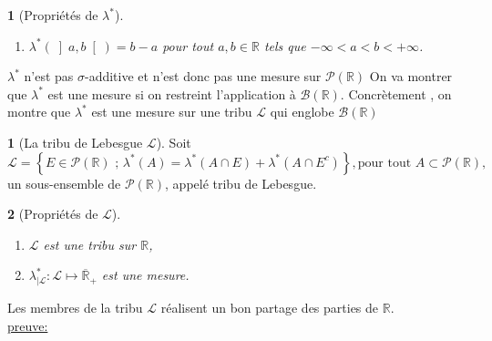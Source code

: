 \documentclass[8pt,notheorems]{beamer}
\def \R{\mathbb R}
\newtheorem{prop}{\translate{Proposition}}
\theoremstyle{definition}
\newtheorem{definition}{\translate{Definition}}
\theoremstyle{example}
\theoremstyle{mystyle}
\theoremstyle{plain}
\begin{document}
\begin{frame}[allowframebreaks]
\begin{prop}[Propriétés de $\lambda^{\ast}$]
\begin{enumerate}
$$
\lambda^{\ast}(A)\leq \sum_{n\in\mathbb{N}}\lambda^{\ast}(A_n).
$$
($\lambda^{\ast}$ est sous $\sigma$-additive)
\item $\lambda^{\ast}\left(\left]a,b\right[\right)=b-a$ pour tout $a,b\in\mathbb{R}$ tels que $-\infty<a<b<+\infty$.
\end{enumerate}
\end{prop}
$\lambda^{\ast}$ n'est pas $\sigma$-additive et n'est donc pas une mesure sur $\mathcal{P}(\mathbb{R})$ On va montrer que $\lambda^{\ast}$ est une mesure si on restreint l'application à $\mathcal{B}(\mathbb{R})$. Concrètement , on montre que $\lambda^{\ast}$ est une mesure sur une tribu $\mathcal{L}$ qui englobe $\mathcal{B}(\mathbb{\R})$
\begin{definition}[La tribu de Lebesgue $\mathcal{L}$]
Soit
$$
\mathcal{L}=\left\{ E\in\mathcal{P}(\R)\text{ ; }\lambda^{\ast}(A)=\lambda^{\ast}(A\cap E)+\lambda^{\ast}(A\cap E^{c})\right\}, \text{pour tout }A\subset\mathcal{P}(\R),
$$
un sous-ensemble de $\mathcal{P}(\R)$, appelé tribu de Lebesgue.
\end{definition}
\begin{prop}[Propriétés de $\mathcal{L}$]
\begin{enumerate}
\item $\mathcal{L}$ est une tribu sur $\mathbb{R}$,
\item $\lambda^{\ast}_{|\mathcal{L}}:\mathcal{L}\mapsto\overline{\R}_+$ est une mesure.
\end{enumerate}
\end{prop}
Les membres de la tribu $\mathcal{L}$ réalisent un bon partage des parties de $\R$.\\
\underline{preuve:}\\


\end{frame}
\end{document}
